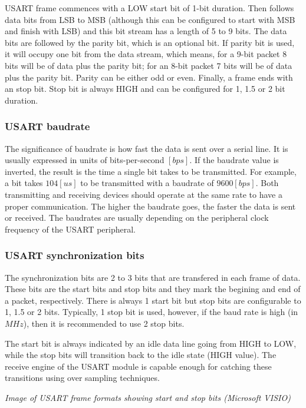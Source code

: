 USART frame commences with a LOW start bit of 1-bit duration. Then follows data bits from LSB to MSB (although this can be configured to start with MSB and finish with LSB) and this bit stream has a length of 5 to 9 bits. The data bits are followed by the parity bit, which is an optional bit. If parity bit is used, it will occupy one bit from the data stream, which means, for a 9-bit packet 8 bits will be of data plus the parity bit; for an 8-bit packet 7 bits will be of data plus the parity bit. Parity can be either odd or even. Finally, a frame ends with an stop bit. Stop bit is always HIGH and can be configured for 1, 1.5 or 2 bit duration.

\subsubsection{USART baudrate}
The significance of baudrate is how fast the data is sent over a serial line. It is usually expressed in units of bits-per-second $[bps]$. If the baudrate value is inverted, the result is the time a single bit takes to be transmitted. For example, a bit takes $104 [us]$ to be transmitted with a baudrate of $9600 [bps]$. Both transmitting and receiving devices should operate at the same rate to have a proper communication. The higher the baudrate goes, the faster the data is sent or received. The baudrates are usually depending on the peripheral clock frequency of the USART peripheral.

\subsubsection{USART synchronization bits}
The synchronization bits are 2 to 3 bits that are transfered in each frame of data. These bits are the start bits and stop bits and they mark the begining and end of a packet, respectively. There is always 1 start bit but stop bits are configurable to 1, 1.5 or 2 bits. Typically, 1 stop bit is used, however, if the baud rate is high (in $MHz$), then it is recommended to use 2 stop bits.

\noindent The start bit is always indicated by an idle data line going from HIGH to LOW, while the stop bits will transition back to the idle state (HIGH value). The receive engine of the USART module is capable enough for catching these transitions using over sampling techniques.

\begin{center}
\textit{Image of USART frame formats showing start and stop bits (Microsoft VISIO)}
\end{center}


